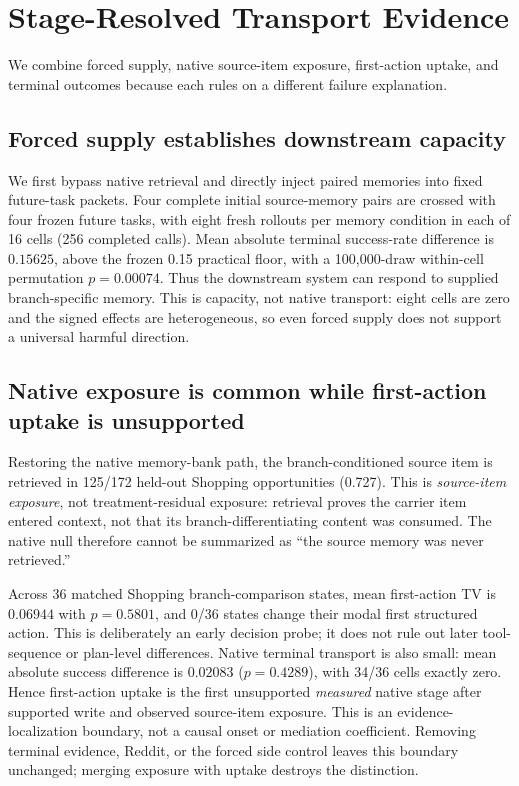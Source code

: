 \section{Stage-Resolved Transport Evidence}
\label{sec:variance}
We combine forced supply, native source-item exposure, first-action uptake, and terminal outcomes because each rules on a different failure explanation.

\subsection{Forced supply establishes downstream capacity}
We first bypass native retrieval and directly inject paired memories into fixed future-task packets. Four complete initial source-memory pairs are crossed with four frozen future tasks, with eight fresh rollouts per memory condition in each of 16 cells (256 completed calls). Mean absolute terminal success-rate difference is $0.15625$, above the frozen 0.15 practical floor, with a 100,000-draw within-cell permutation $p=0.00074$. Thus the downstream system can respond to supplied branch-specific memory. This is capacity, not native transport: eight cells are zero and the signed effects are heterogeneous, so even forced supply does not support a universal harmful direction.

\subsection{Native exposure is common while first-action uptake is unsupported}
Restoring the native memory-bank path, the branch-conditioned source item is retrieved in 125/172 held-out Shopping opportunities (0.727). This is \emph{source-item exposure}, not treatment-residual exposure: retrieval proves the carrier item entered context, not that its branch-differentiating content was consumed. The native null therefore cannot be summarized as ``the source memory was never retrieved.''

Across 36 matched Shopping branch-comparison states, mean first-action TV is $0.06944$ with $p=0.5801$, and 0/36 states change their modal first structured action. This is deliberately an early decision probe; it does not rule out later tool-sequence or plan-level differences. Native terminal transport is also small: mean absolute success difference is $0.02083$ ($p=0.4289$), with 34/36 cells exactly zero. Hence first-action uptake is the first unsupported \emph{measured} native stage after supported write and observed source-item exposure. This is an evidence-localization boundary, not a causal onset or mediation coefficient. Removing terminal evidence, Reddit, or the forced side control leaves this boundary unchanged; merging exposure with uptake destroys the distinction.

